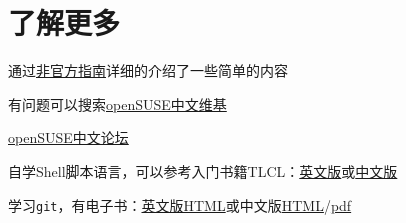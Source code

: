 \documentclass[11pt,openany]{book}
\newcommand{\soft}[1]{\texttt{\textcolor{dgreen}{#1}}}
\begin{document}
\chapter{了解更多}
\begin{compactitem}
 \item 通过\href{https://lug.ustc.edu.cn/sites/opensuse-guide/}{非官方指南}详细的介绍了一些简单的内容
 \item 有问题可以搜索\href{https://zh.opensuse.org/%E9%A6%96%E9%A1%B5}{openSUSE中文维基}
 \item \href{https://forum.suse.org.cn/}{openSUSE中文论坛}
 \item 自学Shell脚本语言，可以参考入门书籍TLCL：\href{http://home.ustc.edu.cn/~zpj/doc/Linux/The_Linux_Command_Line.pdf}{英文版}或\href{http://home.ustc.edu.cn/~zpj/doc/Linux/The_Linux_Command_Line(%e4%b8%ad%e6%96%87%e7%89%88).pdf}{中文版}
 \item 学习\soft{git}，有电子书：\href{http://git-scm.com/book/}{英文版HTML}或中文版\href{http://git-scm.com/book/zh}{HTML}/\href{http://liam0205.me/attachment/Git/progit.zh.pdf}{pdf}
\end{compactitem}
\listoffigures
\end{document}
